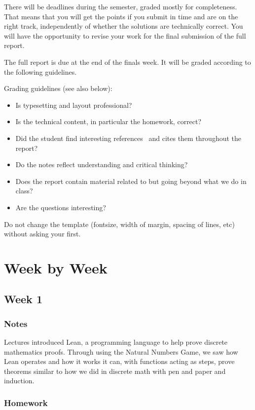 \documentclass{article}
\theoremstyle{theorem}
\theoremstyle{definition}
\theoremstyle{remark}
\begin{document}
There will be deadlines during the semester, graded mostly for completeness. That means that you will get the points if you submit in time and are on the right track, independently of whether the solutions are technically correct. You will have the opportunity to revise your work for the final submission of the full report.

The full report is due at the end of the finals week. It will be graded according to the following guidelines.

Grading  guidelines (see also below):
\begin{itemize}
\item Is typesetting and layout professional? 
\item Is the technical content, in particular the homework, correct?
\item Did the student find interesting references~\cite{bla} and cites them throughout the report?
\item Do the notes reflect understanding and critical thinking?
\item Does the report contain material related to but going beyond what we do in class?
\item Are the questions interesting?
\end{itemize}

Do not change the template (fontsize, width of margin, spacing of lines, etc) without asking your first.

\section{Week by Week}\label{homework}

\subsection{Week 1}

\subsubsection*{Notes}

Lectures introduced Lean, a programming language to help prove discrete mathematics proofs. Through using the Natural Numbers Game, we saw how Lean operates and how it works it can, with functions acting as steps, prove theorems similar to how we did in discrete math with pen and paper and induction.

\subsubsection*{Homework}
\end{document}

